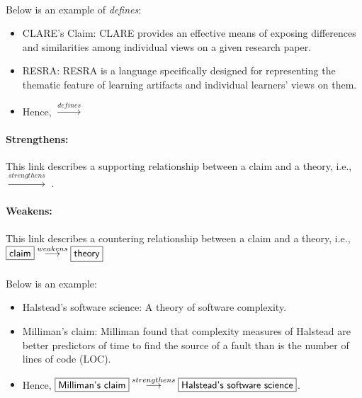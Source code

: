 \paragraph{}Below is an example of {\it defines\/}:

\small
\begin{itemize}
\item {\sf CLARE's Claim:} CLARE provides an effective means of exposing
  differences and similarities among individual views on a given research
  paper.
  
\item {\sf RESRA}: RESRA is a language specifically designed for
  representing the thematic feature of learning artifacts and individual
  learners' views on them.
  
\item Hence, \hspace{.01in} 
  \( \stackrel{defines}{\longrightarrow} \) 
\end{itemize}
\normalsize

\paragraph{Strengthens:}

This link describes a supporting relationship between a claim and a theory,
i.e.,  \( \stackrel{strengthens}{\longrightarrow} \) . 

\paragraph{Weakens:}

This link describes a countering relationship between a claim and a theory,
i.e., \( \fbox{{\sf claim}} \stackrel{weakens}{\longrightarrow} \fbox{{\sf
theory}} \)

\paragraph{}Below is an example:

\small
\begin{itemize}
\item {\sf Halstead's software science:} A theory of software complexity.
  
\item {\sf Milliman's claim}: Milliman found that complexity measures of
  Halstead are better predictors of time to find the source of a fault than
  is the number of lines of code (LOC).
  
\item Hence, \hspace{.01in}\( \fbox{{\sf Milliman's claim}}
  \stackrel{strengthens}{\longrightarrow} \fbox{{\sf Halstead's software
  science}} \).
\end{itemize}
\normalsize


